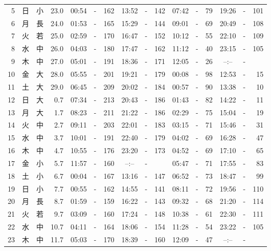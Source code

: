 \documentclass[12pt.a4j]{jsarticle}
\begin{document}
\begin{center}
\begin{table}[ht]
\begin{tabular}{|rc|cr|ccrccr|ccrccr|}
 5 & 日 & 小 & 23.0 &  00:54 &-& 162  &  13:52 &-& 142  &   07:42 &-&  79  &   19:26 &-& 101  \\
 6 & 月 & 長 & 24.0 &  01:53 &-& 165  &  15:29 &-& 144  &   09:01 &-&  69  &   20:49 &-& 108  \\
 7 & 火 & 若 & 25.0 &  02:59 &-& 170  &  16:47 &-& 152  &   10:12 &-&  55  &   22:10 &-& 109  \\
 8 & 水 & 中 & 26.0 &  04:03 &-& 180  &  17:47 &-& 162  &   11:12 &-&  40  &   23:15 &-& 105  \\
 9 & 木 & 中 & 27.0 &  05:01 &-& 191  &  18:36 &-& 171  &   12:05 &-&  26  &   --:-- &-&     \\
10 & 金 & 大 & 28.0 &  05:55 &-& 201  &  19:21 &-& 179  &   00:08 &-&  98  &   12:53 &-&  15  \\
11 & 土 & 大 & 29.0 &  06:45 &-& 209  &  20:02 &-& 184  &   00:57 &-&  90  &   13:38 &-&  10  \\
12 & 日 & 大 &  0.7 &  07:34 &-& 213  &  20:43 &-& 186  &   01:43 &-&  82  &   14:22 &-&  11  \\
13 & 月 & 大 &  1.7 &  08:23 &-& 211  &  21:22 &-& 186  &   02:29 &-&  75  &   15:04 &-&  19  \\
14 & 火 & 中 &  2.7 &  09:11 &-& 203  &  22:01 &-& 183  &   03:15 &-&  71  &   15:46 &-&  31  \\
15 & 水 & 中 &  3.7 &  10:01 &-& 191  &  22:40 &-& 179  &   04:02 &-&  69  &   16:28 &-&  47  \\
16 & 木 & 中 &  4.7 &  10:55 &-& 176  &  23:20 &-& 173  &   04:52 &-&  69  &   17:10 &-&  65  \\
17 & 金 & 小 &  5.7 &  11:57 &-& 160  &  --:-- &-&     &   05:47 &-&  71  &   17:55 &-&  83  \\
18 & 土 & 小 &  6.7 &  00:04 &-& 167  &  13:16 &-& 147  &   06:52 &-&  73  &   18:47 &-&  99  \\
19 & 日 & 小 &  7.7 &  00:55 &-& 162  &  14:55 &-& 141  &   08:11 &-&  72  &   19:56 &-& 110  \\
20 & 月 & 長 &  8.7 &  01:59 &-& 159  &  16:22 &-& 143  &   09:32 &-&  68  &   21:20 &-& 114  \\
21 & 火 & 若 &  9.7 &  03:09 &-& 160  &  17:24 &-& 148  &   10:38 &-&  61  &   22:30 &-& 111  \\
22 & 水 & 中 & 10.7 &  04:11 &-& 164  &  18:06 &-& 154  &   11:28 &-&  54  &   23:22 &-& 105  \\
23 & 木 & 中 & 11.7 &  05:03 &-& 170  &  18:39 &-& 160  &   12:09 &-&  47  &   --:-- &-&     \\

\end{tabular}
\end{table}
\end{center}
\end{document}
